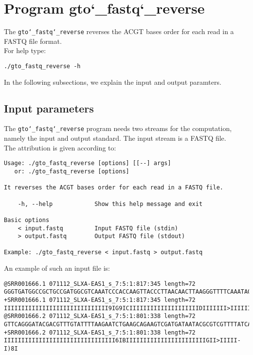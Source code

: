 \section{Program gto\char`_fastq\char`_reverse}
The \texttt{gto\char`_fastq\char`_reverse} reverses the ACGT bases order for each read in a FASTQ file format.\\
For help type:
\begin{lstlisting}
./gto_fastq_reverse -h
\end{lstlisting}
In the following subsections, we explain the input and output paramters.

\subsection*{Input parameters}

The \texttt{gto\char`_fastq\char`_reverse} program needs two streams for the computation, namely the input and output standard. The input stream is a FASTQ file.\\
The attribution is given according to:
\begin{lstlisting}
Usage: ./gto_fastq_reverse [options] [[--] args]
   or: ./gto_fastq_reverse [options]

It reverses the ACGT bases order for each read in a FASTQ file.

    -h, --help            Show this help message and exit

Basic options
    < input.fastq         Input FASTQ file (stdin)
    > output.fastq        Output FASTQ file (stdout)

Example: ./gto_fastq_reverse < input.fastq > output.fastq
\end{lstlisting}
An example of such an input file is:
\begin{lstlisting}
@SRR001666.1 071112_SLXA-EAS1_s_7:5:1:817:345 length=72
GGGTGATGGCCGCTGCCGATGGCGTCAAATCCCACCAAGTTACCCTTAACAACTTAAGGGTTTTCAAATAGA
+SRR001666.1 071112_SLXA-EAS1_s_7:5:1:817:345 length=72
IIIIIIIIIIIIIIIIIIIIIIIIIIIIII9IG9ICIIIIIIIIIIIIIIIIIIIIDIIIIIII>IIIIII/
@SRR001666.2 071112_SLXA-EAS1_s_7:5:1:801:338 length=72
GTTCAGGGATACGACGTTTGTATTTTAAGAATCTGAAGCAGAAGTCGATGATAATACGCGTCGTTTTATCAT
+SRR001666.2 071112_SLXA-EAS1_s_7:5:1:801:338 length=72
IIIIIIIIIIIIIIIIIIIIIIIIIIIIIIII6IBIIIIIIIIIIIIIIIIIIIIIIIGII>IIIII-I)8I
\end{lstlisting}

